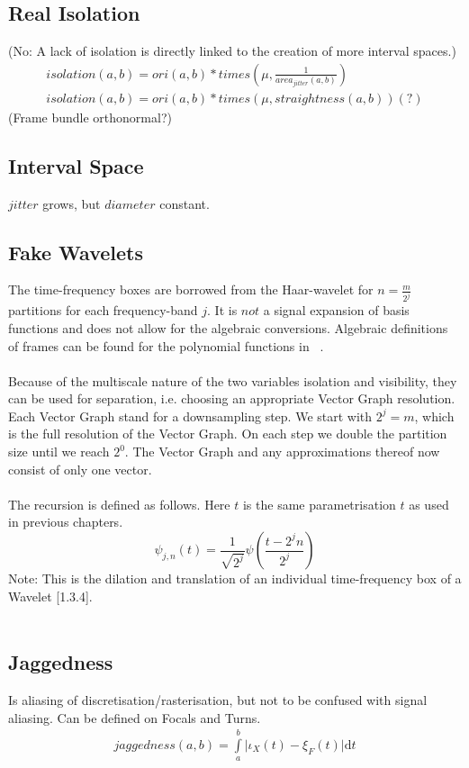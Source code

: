 \documentclass{report}
\begin{document}
\subsection{Real Isolation}
(No: A lack of isolation is directly linked to the creation of more interval spaces.)
\begin{align}
isolation(a,b) = ori(a,b)*times(\mu,\frac{1}{area_{jitter}(a,b)})\\
isolation(a,b) = ori(a,b)*times(\mu,straightness(a,b))(?)
\end{align}
(Frame bundle orthonormal?)
\subsection*{Interval Space}
$jitter$ grows, but $diameter$ constant.

\subsection{Fake Wavelets}
The time-frequency boxes are borrowed from the Haar-wavelet for $n=\frac{m}{2^j}$ partitions for each frequency-band $j$. It is $not$ a signal expansion of basis functions and does not allow for the algebraic conversions. Algebraic definitions of frames can be found for the polynomial functions in ~\cite[Spline\_Axioms.tex]{Axioms}.\\\\
Because of the multiscale nature of the two variables isolation and visibility, they can be used for separation, i.e. choosing an appropriate Vector Graph resolution. Each Vector Graph stand for a downsampling step. We start with $2^j=m$, which is the full resolution of the Vector Graph. On each step we double the partition size until we reach $2^0$. The Vector Graph and any approximations thereof now consist of only one vector.\\\\
The recursion is defined as follows. Here $t$ is the same parametrisation $t$ as used in previous chapters.
\begin{equation}
\psi_{j,n}(t)=\frac{1}{\sqrt{2^j}}\psi(\frac{t-2^j n}{2^j})
\end{equation}
Note: This is the dilation and translation of an individual time-frequency box of a Wavelet \cite{Mallat}[1.3.4].\\\\

\subsection{Jaggedness}
Is aliasing of discretisation/rasterisation, but not to be confused with signal aliasing. Can be defined on Focals and Turns.
\begin{align}
jaggedness(a,b)=\int \limits _{a}^{b} \lvert \iota_{X}(t)-\xi_{F}(t)\rvert \mathrm{d}t
\end{align}
\end{document}
